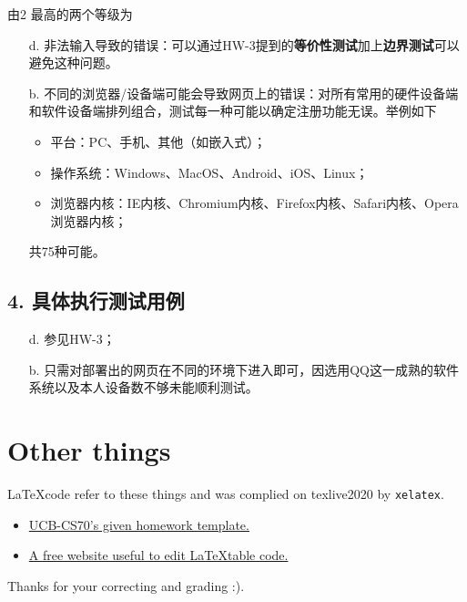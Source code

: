 \documentclass[11pt, oneside]{article}  %
\begin{document}
由2 最高的两个等级为
\begin{itemize}
    \item[d.] 非法输入导致的错误：可以通过HW-3提到的\textbf{等价性测试}加上\textbf{边界测试}可以避免这种问题。
    \item[b.] 不同的浏览器/设备端可能会导致网页上的错误：对所有常用的硬件设备端和软件设备端排列组合，测试每一种可能以确定注册功能无误。举例如下
    \begin{itemize}
        \item 平台：PC、手机、其他（如嵌入式）；
        \item 操作系统：Windows、MacOS、Android、iOS、Linux；
        \item 浏览器内核：IE内核、Chromium内核、Firefox内核、Safari内核、Opera浏览器内核；
    \end{itemize}
    共75种可能。
\end{itemize}

\subsection*{4. 具体执行测试用例}

\begin{itemize}
    \item[d.] 参见HW-3；
    \item[b.] 只需对部署出的网页在不同的环境下进入即可，因选用QQ这一成熟的软件系统以及本人设备数不够未能顺利测试。
\end{itemize}


\section*{Other things}

    \LaTeX \space code refer to these things and was complied on texlive2020 by \lstinline{xelatex}.
    \begin{itemize}
        \item  \href{https://www.eecs70.org/assets/misc/homework_template.tex}{UCB-CS70's given homework template.} 
        \item  \href{https://www.tablesgenerator.com/}{A free website useful to edit \LaTeX \space table code.}
    \end{itemize}

    Thanks for your correcting and grading :).
\end{document}
